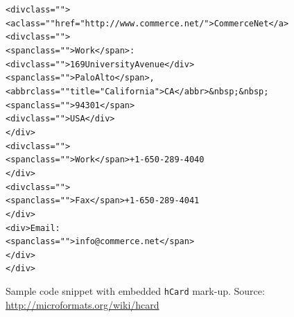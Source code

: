 \documentclass[12pt]{article}
\newenvironment{code}[1]
{\begin{lrbox}{\inverbatim}\begin{minipage}{13.5cm}\begin{alltt}{#1}}
{\end{alltt}\end{minipage}\end{lrbox}\colorbox{lightgray}{\usebox{\inverbatim}}}
\begin{document}
\begin{figure}[htbp!]
\begin{center}
{\footnotesize
\begin{code}
<div class="">
  <a class="" href="http://www.commerce.net/">CommerceNet</a>
  <div class="">
    <span class="">Work</span>:
    <div class="">169 University Avenue</div>
    <span class="">Palo Alto</span>,  
    <abbr class="" title="California">CA</abbr>&nbsp;&nbsp;
    <span class="">94301</span>
    <div class="">USA</div>
  </div>
  <div class="">
   <span class="">Work</span> +1-650-289-4040
  </div>
  <div class="">
    <span class="">Fax</span> +1-650-289-4041
  </div>
  <div>Email: 
   <span class="">info@commerce.net</span>
  </div>
</div>
\end{code}}
  \caption[Sample code snippet with embedded hCard Microformat mark-up.]{Sample code snippet with embedded \texttt{hCard}  mark-up. Source: \url{http://microformats.org/wiki/hcard}}
  \label{code:microformats} 
  \end{center}  
\end{figure}
\end{document}
